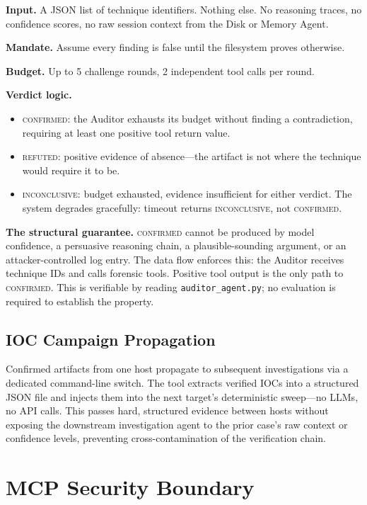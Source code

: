 \documentclass[sigconf, nonacm]{acmart}
\begin{document}
\textbf{Input.} A JSON list of technique identifiers. Nothing else. No reasoning
traces, no confidence scores, no raw session context from the Disk or Memory Agent.

\textbf{Mandate.} Assume every finding is false until the filesystem proves
otherwise.

\textbf{Budget.} Up to 5 challenge rounds, 2 independent tool calls per round.

\textbf{Verdict logic.}
\begin{itemize}
  \item \textsc{confirmed}: the Auditor exhausts its budget without finding a
    contradiction, requiring at least one positive tool return value.
  \item \textsc{refuted}: positive evidence of absence---the artifact is not
    where the technique would require it to be.
  \item \textsc{inconclusive}: budget exhausted, evidence insufficient for
    either verdict. The system degrades gracefully: timeout returns
    \textsc{inconclusive}, not \textsc{confirmed}.
\end{itemize}

\textbf{The structural guarantee.} \textsc{confirmed} cannot be produced by
model confidence, a persuasive reasoning chain, a plausible-sounding argument,
or an attacker-controlled log entry. The data flow enforces this: the Auditor
receives technique IDs and calls forensic tools. Positive tool output is the
only path to \textsc{confirmed}. This is verifiable by reading
\texttt{auditor\_agent.py}; no evaluation is required to establish the property.

\subsection{IOC Campaign Propagation}
\label{sec:ioc}

Confirmed artifacts from one host propagate to subsequent investigations via a
dedicated command-line switch. The tool extracts verified IOCs into a structured
JSON file and injects them into the next target's deterministic sweep---no LLMs,
no API calls. This passes hard, structured evidence between hosts without
exposing the downstream investigation agent to the prior case's raw context or
confidence levels, preventing cross-contamination of the verification chain.

\section{MCP Security Boundary}
\label{sec:security}
\end{document}

